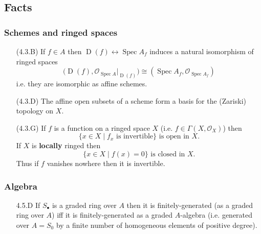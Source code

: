 \documentclass[10pt]{article}
\DeclareMathOperator{\Spec}{Spec}
\DeclareMathOperator{\D}{D}
\renewcommand{\O}{\mathcal{O}}
\begin{document}
        \subsection{Facts}
        
            \subsubsection{Schemes and ringed spaces}
            
                \begin{itemize}
                    \item[(4.3.B)] If $f\in A$ then $\D(f)\leftrightarrow\Spec A_f$ induces a natural isomorphism of ringed spaces \[\big(\D(f),\O_{\Spec A}|_{\D(f)}\big) \cong (\Spec A_f,\O_{\Spec A_f})\] i.e. they are isomorphic as affine schemes.
                    \item[(4.3.D)] The affine open subsets of a scheme form a basis for the (Zariski) topology on $X$.
                    \item[(4.3.G)] If $f$ is a function on a ringed space $X$ (i.e. $f\in\Gamma(X,\O_X)$) then \[\{x\in X \mid f_x\text{ is invertible}\}\text{ is open in }X.\]
                        If $X$ is \textbf{locally} ringed then \[\{x\in X \mid f(x)=0\}\text{ is closed in }X.\]
                        Thus if $f$ vanishes nowhere then it is invertible.
                \end{itemize}
                
            \subsubsection{Algebra}
            
                \begin{itemize}
                    \item [4.5.D] If $S_\bullet$ is a graded ring over $A$ then it is finitely-generated (as a graded ring over $A$) iff it is finitely-generated as a graded $A$-algebra (i.e. generated over $A=S_0$ by a finite number of homogeneous elements of positive degree).
                \end{itemize}
\end{document}
